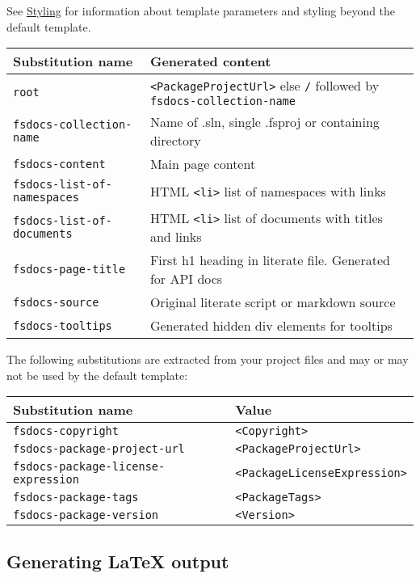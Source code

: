 \documentclass{article}
\begin{document}
See \href{styling.html}{Styling} for information about template parameters and styling beyond the default template.
\begin{tabular}{|l|l|}\hline
\textbf{Substitution name} & \textbf{Generated content}\\ \hline\hline
\texttt{root} & \texttt{<PackageProjectUrl>} else \texttt{/} followed by \texttt{fsdocs-collection-name}\\ \hline
\texttt{fsdocs-collection-name} & Name of .sln, single .fsproj or containing directory\\ \hline
\texttt{fsdocs-content} & Main page content\\ \hline
\texttt{fsdocs-list-of-namespaces} & HTML \texttt{<li>} list of namespaces with links\\ \hline
\texttt{fsdocs-list-of-documents} & HTML \texttt{<li>} list of documents with  titles and links\\ \hline
\texttt{fsdocs-page-title} & First h1 heading in literate file. Generated for API docs\\ \hline
\texttt{fsdocs-source} & Original literate script or markdown source\\ \hline
\texttt{fsdocs-tooltips} & Generated hidden div elements for tooltips\\ \hline
\end{tabular}



The following substitutions are extracted from your project files and may or may not be used by the default
template:
\begin{tabular}{|l|l|}\hline
\textbf{Substitution name} & \textbf{Value}\\ \hline\hline
\texttt{fsdocs-copyright} & \texttt{<Copyright>}\\ \hline
\texttt{fsdocs-package-project-url} & \texttt{<PackageProjectUrl>}\\ \hline
\texttt{fsdocs-package-license-expression} & \texttt{<PackageLicenseExpression>}\\ \hline
\texttt{fsdocs-package-tags} & \texttt{<PackageTags>}\\ \hline
\texttt{fsdocs-package-version} & \texttt{<Version>}\\ \hline
\end{tabular}

\subsection*{Generating LaTeX output}
\end{document}
